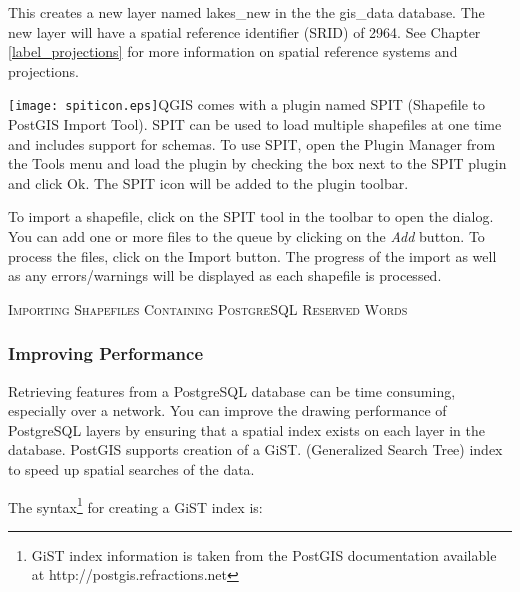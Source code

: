 This creates a new layer named lakes\_new in the the gis\_data database. The
new layer will have a spatial reference identifier (SRID) of 2964. See Chapter
\ref{label_projections} for more information on spatial reference systems and
projections.

\texttt{[image: spiticon.eps]}QGIS comes with a
plugin named SPIT (Shapefile to PostGIS Import Tool).
SPIT can be used to load multiple shapefiles at one time and includes support
for schemas. To use SPIT, open the Plugin Manager from the Tools menu and load
the plugin by checking the box next to the SPIT plugin and click Ok. The SPIT
icon will be added to the plugin toolbar. 

To import a shapefile, click on the SPIT tool in the toolbar to open the
dialog.
You can add one or more files to the queue by clicking on the \textsl{Add}
button. To process the files, click on the Import button. The progress of the
import as well as any errors/warnings will be displayed as each shapefile is
processed.  

\begin{Tip}\caption{\textsc{Importing Shapefiles Containing
PostgreSQL Reserved Words}}
\end{Tip} 

\subsubsection{Improving Performance}\label{label_improve}

Retrieving features from a PostgreSQL database can be time consuming,
especially over a network. You can improve the drawing performance of
PostgreSQL layers by ensuring that a  spatial
index
exists on each layer in the database. PostGIS supports creation of a
 GiST.
(Generalized Search Tree) index to speed up spatial searches of the data.

The syntax\footnote{GiST index information is taken from the PostGIS
documentation available at http://postgis.refractions.net} for creating a GiST
index is:

